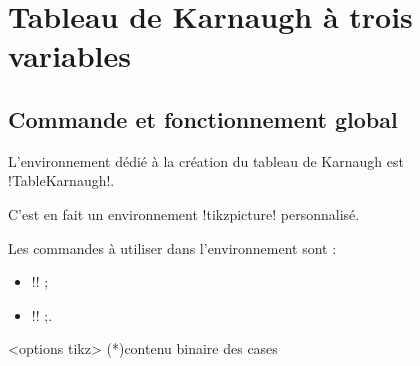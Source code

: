 \documentclass[french,a4paper,11pt]{article}
\begin{document}
{{\pagebreak

\section{Tableau de Karnaugh à trois variables}

\subsection{Commande et fonctionnement global}

\begin{cautionblock}
L'environnement dédié à la création du tableau de Karnaugh est \motcletex!TableKarnaugh!.

C'est en fait un environnement \motcletex!tikzpicture! personnalisé.

\smallskip

Les commandes à utiliser dans l'environnement sont :

\begin{itemize}
	\item \motcletex!\KarnaughCasesResult! ;
	\item \motcletex!\KarnaughBlocRegroup! ;.
\end{itemize}
\vspace*{-\baselineskip}\leavevmode
\end{cautionblock}

\begin{DemoCode}
\begin{TableKarnaugh}[clés]<options tikz>
	\KarnaughCasesResult(*){contenu binaire des cases}
\end{TableKarnaugh}
\end{DemoCode}
%

\begin{DemoCode}[]
\begin{TableKarnaugh}[Aide]
\end{TableKarnaugh}
\hspace{0.5cm}
\begin{TableKarnaugh}[Variables=u/v/w]
\end{TableKarnaugh}
\hspace{0.5cm}
\begin{TableKarnaugh}[Variables=u/v/w,Swap]
\end{TableKarnaugh}


\end{DemoCode}}}
\end{document}
